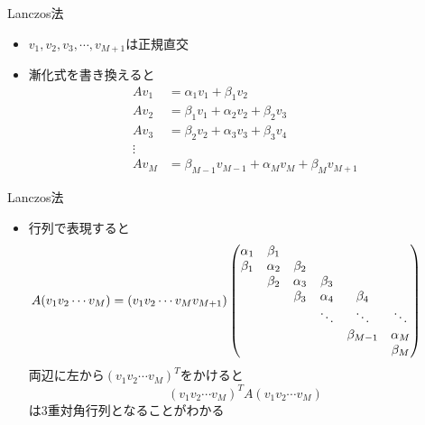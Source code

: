 \begin{frame}[t,fragile]{Lanczos法}
  \begin{itemize}
    \setlength{\itemsep}{1em}
  \item $v_1,v_2,v_3,\cdots,v_{M+1}$は正規直交
  \item 漸化式を書き換えると
    \begin{align*}
      Av_1 &= \alpha_1 v_1 + \beta_1 v_2 \\
      Av_2 &= \beta_1 v_1 + \alpha_2 v_2 + \beta_2 v_3 \\
      Av_3 &= \beta_2 v_2 + \alpha_3 v_3 + \beta_3 v_4 \\
      \vdots \\
      Av_{M} &= \beta_{M-1} v_{M-1} + \alpha_M v_M + \beta_M v_{M+1}
    \end{align*}
  \end{itemize}
\end{frame}

\begin{frame}[t,fragile]{Lanczos法}
  \begin{itemize}
    \setlength{\itemsep}{1em}
  \item 行列で表現すると
    \begin{align*}
      \hspace*{-2em}
      A
      (v_1v_2\cdots v_M)
      &=
      (v_1v_2\cdots v_M v_{M+1})
      \begin{pmatrix}
        \alpha_1 & \beta_1\\
        \beta_1 & \alpha_2 & \beta_2 \\
        & \beta_2 & \alpha_3 & \beta_3 \\
        & & \beta_3 & \alpha_4 & \beta_4 \\
        & & & \ddots & \ddots & \ddots \\
        & & & & \beta_{M-1} & \alpha_M \\
        & & & & & \beta_M \\
      \end{pmatrix}
    \end{align*}
    両辺に左から$(v_1v_2\cdots v_M)^T$をかけると
    \[
    (v_1v_2\cdots v_M)^T A (v_1v_2\cdots v_M)
    \]
    は3重対角行列となることがわかる
  \end{itemize}
\end{frame}

